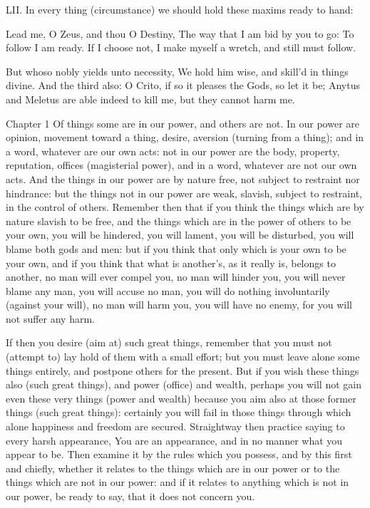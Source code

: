 LII. In every thing (circumstance) we should hold these maxims ready to hand:

Lead me, O Zeus, and thou O Destiny,
The way that I am bid by you to go:
To follow I am ready. If I choose not,
I make myself a wretch, and still must follow.

But whoso nobly yields unto necessity,
We hold him wise, and skill'd in things divine.
And the third also: O Crito, if so it pleases the Gods, so let it be; Anytus and Meletus are able indeed to kill me, but they cannot harm me.

Chapter 1 Of things some are in our power, and others are not. In our power are opinion, movement toward a thing, desire, aversion (turning from a thing); and in a word, whatever are our own acts: not in our power are the body, property, reputation, offices (magisterial power), and in a word, whatever are not our own acts. And the things in our power are by nature free, not subject to restraint nor hindrance: but the things not in our power are weak, slavish, subject to restraint, in the control of others. Remember then that if you think the things which are by nature slavish to be free, and the things which are in the power of others to be your own, you will be hindered, you will lament, you will be disturbed, you will blame both gods and men: but if you think that only which is your own to be your own, and if you think that what is another's, as it really is, belongs to another, no man will ever compel you, no man will hinder you, you will never blame any man, you will accuse no man, you will do nothing involuntarily (against your will), no man will harm you, you will have no enemy, for you will not suffer any harm.

If then you desire (aim at) such great things, remember that you must not (attempt to) lay hold of them with a small effort; but you must leave alone some things entirely, and postpone others for the present. But if you wish these things also (such great things), and power (office) and wealth, perhaps you will not gain even these very things (power and wealth) because you aim also at those former things (such great things): certainly you will fail in those things through which alone happiness and freedom are secured. Straightway then practice saying to every harsh appearance, You are an appearance, and in no manner what you appear to be. Then examine it by the rules which you possess, and by this first and chiefly, whether it relates to the things which are in our power or to the things which are not in our power: and if it relates to anything which is not in our power, be ready to say, that it does not concern you.



